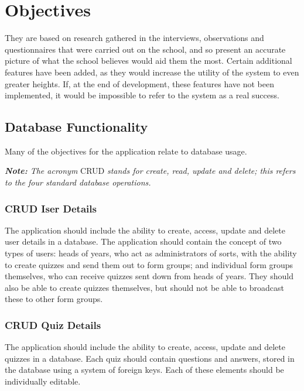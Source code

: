 
\section{Objectives}
They are based on research gathered in the interviews, observations and questionnaires that were carried out on the school, and so present an accurate picture of what the school believes would aid them the most. Certain additional features have been added, as they would increase the utility of the system to even greater heights. If, at the end of development, these features have not been implemented, it would be impossible to refer to the system as a real success.

\subsection{Database Functionality}
Many of the objectives for the application relate to database usage. 

\textit{\textbf{Note:} The acronym }CRUD \textit{stands for create, read, update and delete; this refers to the four standard database operations.}

\subsubsection{CRUD Iser Details}
The application should include the ability to create, access, update and delete user details in a database. The application should contain the concept of two types of users: heads of years, who act as administrators of sorts, with the ability to create quizzes and send them out to form groups; and individual form groups themselves, who can receive quizzes sent down from heads of years. They should also be able to create quizzes themselves, but should not be able to broadcast these to other form groups.

\subsubsection{CRUD Quiz Details}
The application should include the ability to create, access, update and delete quizzes in a database. Each quiz should contain questions and answers, stored in the database using a system of foreign keys. Each of these elements should be individually editable.

